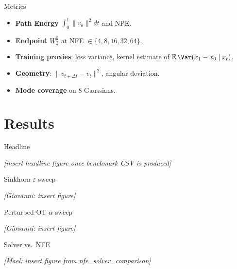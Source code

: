 \documentclass[10pt, aspectratio=169]{beamer}
\begin{document}
\begin{frame}{Metrics}
    \begin{itemize}
        \item \textbf{Path Energy} $\int_0^1 \|v_\theta\|^2 dt$ and NPE.
        \item \textbf{Endpoint $W_2^2$} at NFE $\in \{4, 8, 16, 32, 64\}$.
        \item \textbf{Training proxies}: loss variance, kernel estimate of
              $\mathbb E\,\Var(x_1 - x_0 \mid x_t)$.
        \item \textbf{Geometry}: $\|v_{t+\Delta t} - v_t\|^2$, angular deviation.
        \item \textbf{Mode coverage} on 8-Gaussians.
    \end{itemize}
\end{frame}

\section{Results}

\begin{frame}{Headline}
    \begin{center}
        \emph{[insert headline figure once benchmark CSV is produced]}
    \end{center}
\end{frame}

\begin{frame}{Sinkhorn $\varepsilon$ sweep}
    \begin{center}
        \emph{[Giovanni: insert figure]}
    \end{center}
\end{frame}

\begin{frame}{Perturbed-OT $\alpha$ sweep}
    \begin{center}
        \emph{[Giovanni: insert figure]}
    \end{center}
\end{frame}

\begin{frame}{Solver vs.\ NFE}
    \begin{center}
        \emph{[Mael: insert figure from nfe\_solver\_comparison]}
    \end{center}
\end{frame}
\end{document}
